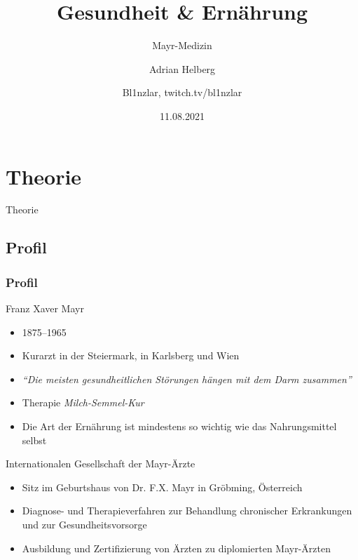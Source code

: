 \documentclass[xcolor=dvipsnames]{beamer}
\title{Gesundheit \& Ernährung}
\subtitle{Mayr-Medizin}
\author{Adrian Helberg}
\author{Bl1nzlar, twitch.tv/bl1nzlar}
\date{11.08.2021}
\begin{document}
    \maketitle


    \section{Theorie}
    {
    \begin{frame}
        \begin{center}
            \Huge Theorie
        \end{center}
    \end{frame}
    }

    \subsection{Profil}
    \begin{frame}[allowframebreaks]
        \frametitle{Profil}

        \begin{block}{Franz Xaver Mayr}
            \begin{itemize}
                \setlength\itemsep{1em}
                \item 1875–1965
                \item Kurarzt in der Steiermark, in Karlsberg und Wien
                \item \textit{"`Die meisten gesundheitlichen Störungen hängen mit dem Darm zusammen"'}
                \item Therapie \textit{Milch-Semmel-Kur}
                \item Die Art der Ernährung ist mindestens so wichtig wie das Nahrungsmittel selbst
            \end{itemize}
        \end{block}

        \famebreak

        \begin{block}{Internationalen Gesellschaft der Mayr-Ärzte}
            \begin{itemize}
                \setlength\itemsep{1em}
                \item Sitz im Geburtshaus von Dr. F.X. Mayr in Gröbming, Österreich
                \item Diagnose- und Therapieverfahren zur Behandlung chronischer Erkrankungen und zur Gesundheitsvorsorge
                \item Ausbildung und Zertifizierung von Ärzten zu diplomierten Mayr-Ärzten
            \end{itemize}
        \end{block}
    \end{frame}
\end{document}
